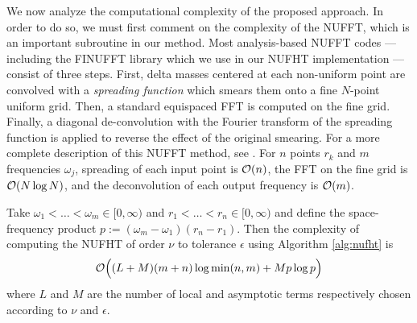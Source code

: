 We now analyze the computational complexity of the proposed approach. In order
to do so, we must first comment on the complexity of the NUFFT, which is an
important subroutine in our method. Most analysis-based NUFFT codes ---
including the FINUFFT library \cite{barnett2019parallel} which we use in our
NUFHT implementation --- consist of three steps. First, delta masses centered at
each non-uniform point are convolved with a \textit{spreading function} which
smears them onto a fine $N$-point uniform grid. Then, a standard equispaced FFT
is computed on the fine grid. Finally, a diagonal de-convolution with the
Fourier transform of the spreading function is applied to reverse the effect of
the original smearing. For a more complete description of this NUFFT method, see
\cite{dutt1993fast,greengard2004accelerating,barnett2019parallel}. For $n$
points $r_k$ and $m$ frequencies $\omega_j$, spreading of each input point is
$\mathcal{O}(n)$, the FFT on the fine grid is $\mathcal{O}(N\log N)$, and the deconvolution of
each output frequency is $\mathcal{O}(m)$. 

\begin{theorem} \label{thm:complexity} Take $\omega_1 < \dots < \omega_m \in
    [0,\infty)$ and $r_1 < \dots < r_n \in [0,\infty)$ and define the
    space-frequency product $p := (\omega_m - \omega_1)(r_n - r_1)$. Then the
    complexity of computing the NUFHT of order $\nu$ to tolerance $\epsilon$
    using Algorithm \ref{alg:nufht} is 
    $$\mathcal{O}\Big((L + M)(m + n) \log \min(n,m) + Mp\log p\Big)$$ where $L$ and $M$
    are the number of local and asymptotic terms respectively chosen according
    to $\nu$ and $\epsilon$.
\end{theorem}

